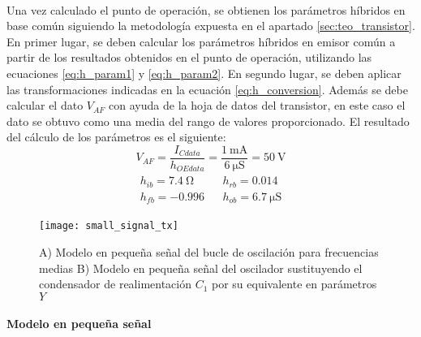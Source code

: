 \paragraph{}
Una vez calculado el punto de operaci\'on, se obtienen los par\'ametros h\'ibridos en base com\'un siguiendo la metodolog\'ia expuesta en el apartado \ref{sec:teo_transistor}. En primer lugar, se deben calcular los parámetros híbridos en emisor común a partir de los resultados obtenidos en el punto de operación, utilizando las ecuaciones \ref{eq:h_param1} y \ref{eq:h_param2}. En segundo lugar, se deben aplicar las transformaciones indicadas en la ecuaci\'on \ref{eq:h_conversion}. Adem\'as se debe calcular el dato $V_{AF}$ con ayuda de la hoja de datos del transistor, en este caso el dato se obtuvo como una media del rango de valores proporcionado. El resultado del c\'alculo de los par\'ametros es el siguiente:
\begin{equation}
   \label{eq:result_pol1}
V_{AF} = \frac{I_{Cdata}}{h_{OEdata}} =\frac{\SI{1}{\milli\ampere}}{\SI{6}{\micro\siemens}} =  \SI{50}{\volt} 
\end{equation}
\begin{equation}
   \label{eq:result_pol2}
\begin{array}{rl} 
      \begin{array}{l}
	 h_{ib} =  \SI{7.4}{\ohm} \\
	 h_{fb} =  -0.996
      \end{array}
      &
      \begin{array}{l}
	 h_{rb} =  0.014 \\
	 h_{ob} =  \SI{6.7}{\micro\siemens}
      \end{array}
\end{array}
\end{equation}

\begin{figure}[h]
    \centering
    \texttt{[image: small\_signal\_tx]}
    \caption{A) Modelo en pequeña señal del bucle de oscilación para frecuencias medias B) Modelo en pequeña señal del oscilador sustituyendo el condensador de realimentación $C_1$ por su equivalente en parámetros $Y$}
    \label{fig:ss_tx}
\end{figure}

\paragraph{}
\paragraph{Modelo en pequeña señal} 
